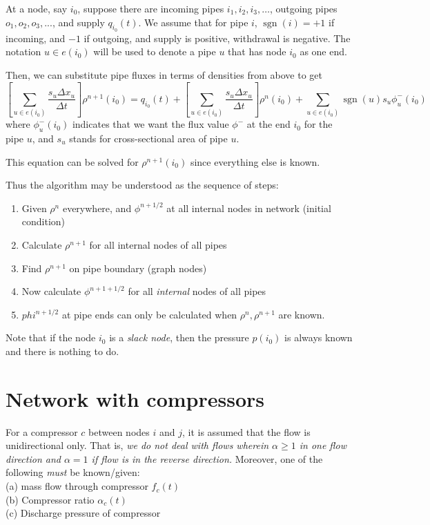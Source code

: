 \documentclass{amsart}
\DeclareMathOperator{\sgn}{sgn}
\begin{document}
At a node, say $i_0$, suppose there are incoming pipes $i_1, i_2, i_3, \dotsc$, outgoing pipes $o_1, o_2, o_3, ...$, and supply $q_{i_0}(t)$. We assume that for pipe $i$, $\sgn(i) = +1$ if incoming, and $-1$ if outgoing, and supply is positive, withdrawal is negative. The notation $u \in e(i_0)$ will be used to denote a pipe $u$ that has node $i_0$ as one end. 

Then, we can substitute pipe fluxes in terms of densities from above to get
\begin{equation}
\left[\sum_{u \in e(i_0)}\frac{s_u \Delta x_u}{\Delta t}\right]\rho^{n+1}(i_0) = q_{i_0}(t) + \left[\sum_{u \in e(i_0)}\frac{s_u \Delta x_u}{\Delta t}\right]\rho^{n}(i_0) + \sum_{u \in e(i_0)}\sgn(u) s_u \phi_{u}^-(i_0) 
\end{equation}
where $\phi_{u}^-(i_0)$ indicates that we want the flux value $\phi^-$ at the end $i_0$ for the pipe $u$, and $s_u$ stands for cross-sectional area of pipe $u$.

This equation can be solved for $\rho^{n+1}(i_0)$ since everything else is known.

Thus the algorithm may be understood as the sequence of steps:
\begin{enumerate}
\item Given $\rho^n$ everywhere, and $\phi^{n+1/2}$ at all internal nodes in network (initial condition)	
 \item Calculate $\rho^{n+1}$ for all internal nodes of all pipes 
 \item Find $\rho^{n+1}$ on pipe boundary (graph nodes)
 \item Now calculate $\phi^{n+1 + 1/2}$ for all \emph{internal} nodes of all pipes
 \item $phi^{n+1/2}$ at pipe ends can only be calculated when $\rho^n, \rho^{n+1}$ are known.
 \end{enumerate} 
Note that if the node $i_0$ is a \emph{slack node}, then the pressure $p(i_0)$ is always known and there is nothing to do.


\section{Network with compressors}
For a compressor $c$ between nodes $i$ and $j$, it is assumed that the flow is unidirectional only. That is, \emph{we do not deal with flows wherein $\alpha \geq 1$ in one flow direction and $\alpha=1$  if  flow is in the reverse direction.} 
Moreover, one of the following \emph{must} be known/given: \\
(a) mass flow through compressor $f_c(t)$ \\
(b) Compressor ratio $\alpha_c(t)$ \\
(c) Discharge pressure of compressor \\ 
\end{document}
